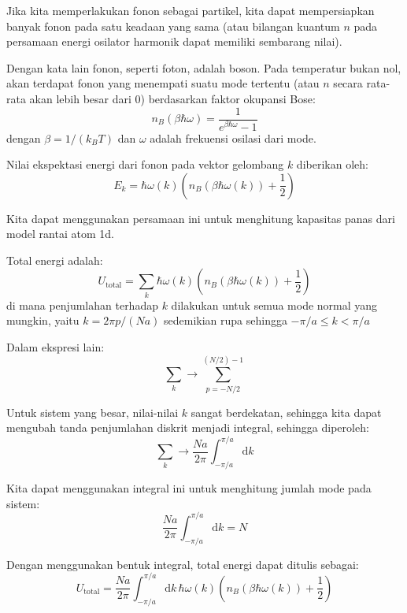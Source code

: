 Jika kita memperlakukan fonon sebagai partikel, kita dapat mempersiapkan
banyak fonon pada satu keadaan yang sama (atau bilangan kuantum $n$
pada persamaan energi osilator harmonik dapat memiliki sembarang nilai).

Dengan kata lain fonon, seperti foton, adalah boson. Pada temperatur
bukan nol, akan terdapat fonon yang menempati suatu mode tertentu (atau
$n$ secara rata-rata akan lebih besar dari 0) berdasarkan faktor
okupansi Bose:
\begin{equation*}
n_{B}(\beta\hbar\omega) = \frac{1}{e^{\beta\hbar\omega} - 1}  
\end{equation*}
dengan $\beta = 1/(k_{B}T)$ dan $\omega$ adalah frekuensi osilasi
dari mode.

Nilai ekspektasi energi dari fonon pada vektor gelombang $k$ diberikan
oleh:
\begin{equation}
E_{k} = \hbar\omega(k)\left( n_{B}(\beta\hbar\omega(k)) + \frac{1}{2} \right)
\end{equation}

Kita dapat menggunakan persamaan ini untuk menghitung kapasitas panas
dari model rantai atom 1d.

Total energi adalah:
\begin{equation}
U_{\mathrm{total}} = \sum_{k} \hbar \omega(k) \left(
  n_{B}(\beta\hbar\omega(k)) + \frac{1}{2}
  \right)  
\end{equation}
di mana penjumlahan terhadap $k$ dilakukan untuk semua mode normal
yang mungkin, yaitu $k = 2\pi p /(Na)$ sedemikian rupa sehingga
$-\pi/a \leq k < \pi/a$

Dalam ekspresi lain:
\begin{equation*}
\sum_{k} \rightarrow \sum_{p = -N/2}^{(N/2)-1}  
\end{equation*}

Untuk sistem yang besar, nilai-nilai $k$ sangat berdekatan, sehingga
kita dapat mengubah tanda penjumlahan diskrit menjadi integral, sehingga
diperoleh:
\begin{equation}
\sum_{k} \rightarrow \frac{Na}{2\pi} \int_{-\pi/a}^{\pi/a}\mathrm{d}k
\end{equation}

Kita dapat menggunakan integral ini untuk menghitung jumlah mode pada
sistem:
\begin{equation*}
\frac{Na}{2\pi} \int_{-\pi/a}^{\pi/a}\mathrm{d}k = N
\end{equation*}

Dengan menggunakan bentuk integral, total energi dapat ditulis sebagai:
\begin{equation*}
U_{\mathrm{total}} = \frac{Na}{2\pi}
\int_{-\pi/a}^{\pi/a} \mathrm{d}k \, \hbar \omega(k) \left(
n_{B}(\beta\hbar\omega(k)) + \frac{1}{2}
\right)
\end{equation*}


